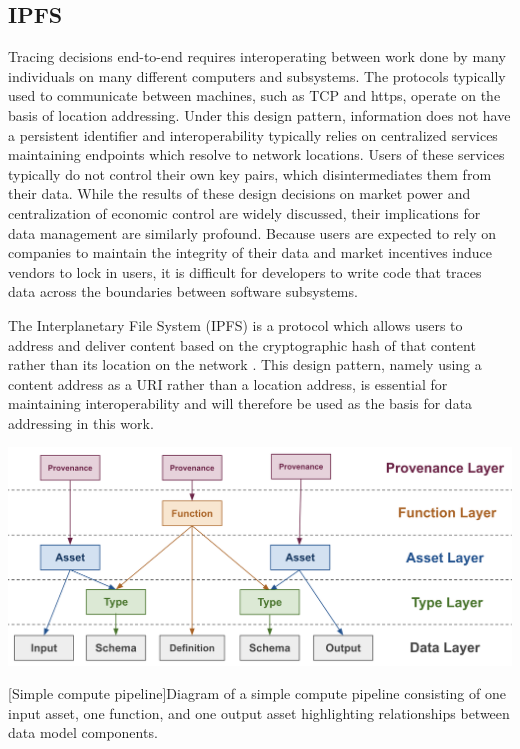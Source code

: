 \documentclass[9pt, oneside]{article}   	%
\begin{document}
\begin{multicols}{2}
\subsection{IPFS}\label{IPFS}
Tracing decisions end-to-end requires interoperating between work done by many individuals on many different computers and subsystems. The protocols typically used to communicate between machines, such as TCP and https, operate on the basis of location addressing. Under this design pattern, information does not have a persistent identifier and interoperability typically relies on centralized services maintaining endpoints which resolve to network locations. Users of these services typically do not control their own key pairs, which disintermediates them from their data. While the results of these design decisions on market power and centralization of economic control are widely discussed, their implications for data management are similarly profound. Because users are expected to rely on companies to maintain the integrity of their data and market incentives induce vendors to lock in users, it is difficult for developers to write code that traces data across the boundaries between software subsystems.

The Interplanetary File System (IPFS) is a protocol which allows users to address and deliver content based on the cryptographic hash of that content rather than its location on the network \cite{ipfs-paper}. This design pattern, namely using a content address as a URI rather than a location address, is essential for maintaining interoperability and will therefore be used as the basis for data addressing in this work.

\end{multicols}
\begin{center}
\includegraphics[width=1\columnwidth]{Fig2_layers_20230715}
\begin{flushright}
[Simple compute pipeline]{Diagram of a simple compute pipeline consisting of one input asset, one function, and one output asset highlighting relationships between data model components.}
\label{layeredDataFig1}
\end{flushright}
\end{center}
\end{document}
